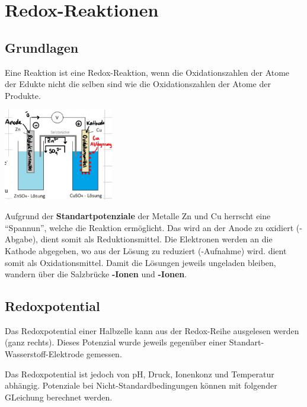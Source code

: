 \section{Redox-Reaktionen}

\subsection{Grundlagen}
    Eine Reaktion ist eine Redox-Reaktion, wenn die Oxidationszahlen der Atome der Edukte nicht die selben sind wie die Oxidationszahlen der Atome der Produkte.
    \begin{center}
        \includegraphics[height=4cm]{pictures/Galv.png}
    \end{center}
    Aufgrund der \textbf{Standartpotenziale} der Metalle Zn und Cu herrscht eine ``Spannun'', welche die Reaktion ermöglicht. 
    Das \textbf{} wird an der Anode zu \textbf{} oxidiert (-Abgabe), \textbf{} dient somit als Reduktionsmittel. 
    Die Elektronen werden an die Kathode abgegeben, wo \textbf{} aus der Lösung zu \textbf{} reduziert (-Aufnahme) wird. 
    \textbf{} dient somit als Oxidationsmittel. Damit die Lösungen jeweils ungeladen bleiben, wandern über die Salzbrücke 
    \textbf{-Ionen} und \textbf{-Ionen}.
\subsection{Redoxpotential}
    Das Redoxpotential einer Halbzelle kann aus der Redox-Reihe ausgelesen werden (ganz rechts). Dieses Potenzial wurde jeweils 
    gegenüber einer Standart-Wasserstoff-Elektrode gemessen.
    
    Das Redoxpotential ist jedoch von pH, Druck, Ionenkonz und Temperatur abhängig. Potenziale bei Nicht-Standardbedingungen können 
    mit folgender GLeichung berechnet werden.

